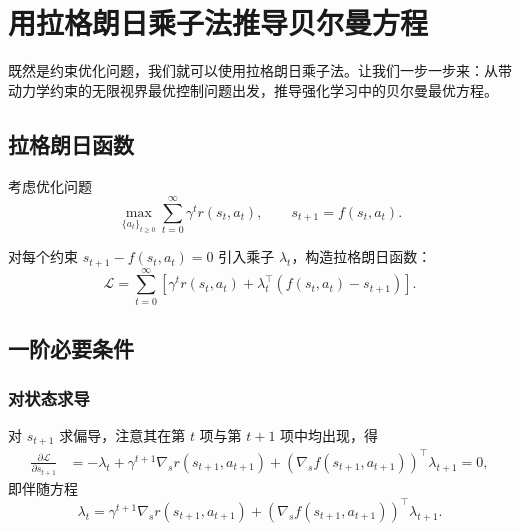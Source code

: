 \section{用拉格朗日乘子法推导贝尔曼方程}

既然是约束优化问题，我们就可以使用拉格朗日乘子法。让我们一步一步来：从带动力学约束的无限视界最优控制问题出发，推导强化学习中的贝尔曼最优方程。

\subsection{拉格朗日函数}

考虑优化问题
\[
\max_{\{a_t\}_{t\ge0}} \sum_{t=0}^{\infty} \gamma^{t} r(s_t,a_t),
\qquad
s_{t+1}=f(s_t,a_t).
\]

对每个约束 $s_{t+1}-f(s_t,a_t)=0$ 引入乘子 $\lambda_t$，构造拉格朗日函数：
\begin{equation}
    \mathcal{L}
    =
    \sum_{t=0}^{\infty}
    \left[
        \gamma^{t} r(s_t,a_t)
        +
        \lambda_t^{\top} (f(s_t,a_t)-s_{t+1})
    \right].
\end{equation}

\subsection{一阶必要条件}

\subsubsection*{对状态求导}

对 $s_{t+1}$ 求偏导，注意其在第 $t$ 项与第 $t+1$ 项中均出现，得
\begin{align}
    \frac{\partial \mathcal{L}}{\partial s_{t+1}}
    &=
    -\lambda_t
    +
    \gamma^{t+1}\nabla_s r(s_{t+1},a_{t+1})
    +
    \left(\nabla_s f(s_{t+1},a_{t+1})\right)^{\!\top} \lambda_{t+1}
    =0,
\end{align}
即伴随方程
\begin{equation}
    \lambda_t
    =
    \gamma^{t+1}\nabla_s r(s_{t+1},a_{t+1})
    +
    \left(\nabla_s f(s_{t+1},a_{t+1})\right)^{\!\top} \lambda_{t+1}.
    \label{eq:adjoint}
\end{equation}

